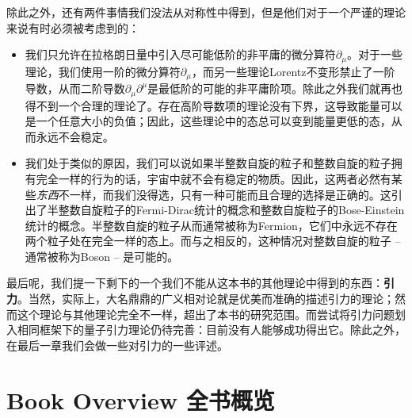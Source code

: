 除此之外，还有两件事情我们没法从对称性中得到，但是他们对于一个严谨的理论来说有时必须被考虑到的：

\begin{itemize}
\item 我们只允许在拉格朗日量中引入尽可能低阶的非平庸的微分算符$\partial_\mu$。对于一些理论，我们使用一阶的微分算符$\partial_\mu$，而另一些理论Lorentz不变形禁止了一阶导数，从而二阶导数$\partial_\mu\partial^\mu$是最低阶的可能的非平庸阶项。除此之外我们就再也得不到一个合理的理论了。存在高阶导数项的理论没有下界，这导致能量可以是一个任意大小的负值；因此，这些理论中的态总可以变到能量更低的态，从而永远不会稳定。
\item 我们处于类似的原因，我们可以说如果半整数自旋的粒子和整数自旋的粒子拥有完全一样的行为的话，宇宙中就不会有稳定的物质。因此，这两者必然有某些{\it 东西}不一样，而我们没得选，只有一种可能而且合理的选择是正确的。这引出了半整数自旋粒子的Fermi-Dirac统计的概念和整数自旋粒子的Bose-Einstein统计的概念。半整数自旋的粒子从而通常被称为Fermion，它们中永远不存在两个粒子处在完全一样的态上。而与之相反的，这种情况对整数自旋的粒子 -- 通常被称为Boson -- 是可能的。
\end{itemize}

最后呢，我们提一下剩下的一个我们不能从这本书的其他理论中得到的东西：{\bf 引力}。当然，实际上，大名鼎鼎的广义相对论就是优美而准确的描述引力的理论；然而这个理论与其他理论完全不一样，超出了本书的研究范围。而尝试将引力问题划入相同框架下的量子引力理论仍待完善：目前没有人能够成功得出它。除此之外，在最后一章我们会做一些对引力的一些评述。

\section{Book Overview 全书概览}

\begin{center}
\end{center}

